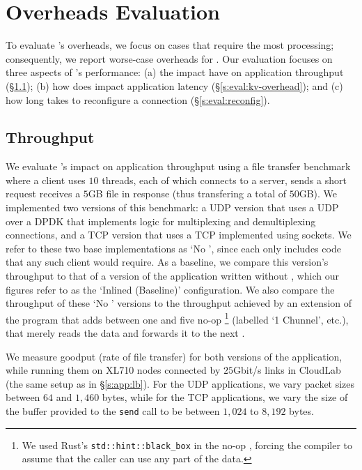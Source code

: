 \section{\name Overheads Evaluation}\label{s:eval}
To evaluate \name's overheads, we focus on cases that require the most processing; consequently, we report worse-case overheads for \name. Our evaluation focuses on three aspects of \name's performance: (a) the impact \tunnels have on application throughput (\S\ref{s:eval:tput}); (b) how does \name impact application latency (\S\ref{s:eval:kv-overhead}); and (c) how long \name takes to reconfigure a connection (\S\ref{s:eval:reconfig}).



\subsection{Throughput}\label{s:eval:tput}


We evaluate \name's impact on application throughput using a file transfer benchmark where a client uses $10$ threads, each of which connects to a server, sends a short request receives a $5$GB file in response (thus transfering a total of $50$GB). We implemented two versions of this benchmark: a UDP version that uses a UDP \tunnel over a DPDK \tunnel that implements logic for multiplexing and demultiplexing connections, and a TCP version that uses a TCP \tunnel implemented using sockets. We refer to these two base implementations as `No \tunnel', since each only includes code that any such client would require. As a baseline, we compare this version's throughput to that of a version of the application written without \name, which our figures refer to as the `Inlined (Baseline)' configuration.
We also compare the throughput of these `No \tunnel' versions to the throughput achieved by an extension of the program that adds between one and five no-op \tunnels\footnote{We used Rust's \texttt{std::hint::black\_box} in the no-op \tunnel, forcing the compiler to assume that the caller can use any part of the data.} (labelled `1 Chunnel', etc.), that merely reads the data and forwards it to the next \tunnel. 

We measure goodput (\ie rate of file transfer) for both versions of the application, while running them on XL710 nodes connected by $25$Gbit/s links in CloudLab (the same setup as in \S\ref{s:app:lb}). For the UDP applications, we vary packet sizes between $64$ and $1,460$ bytes, while for the TCP applications, we vary the size of the buffer provided to the \texttt{send} call to be between $1,024$ to $8,192$ bytes.%

